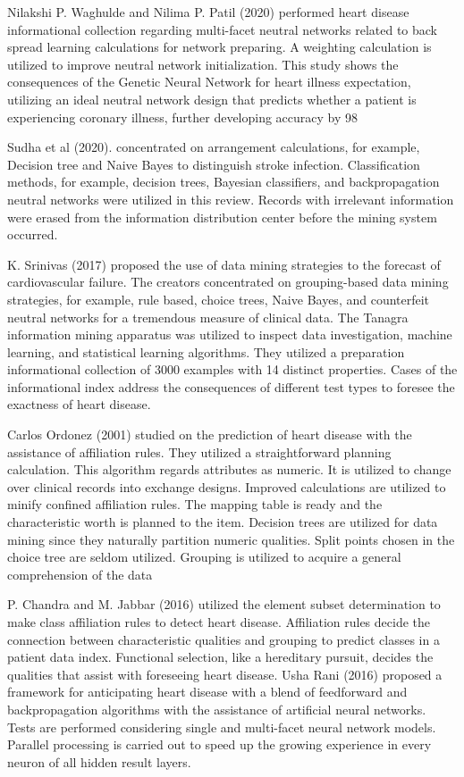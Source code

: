 Nilakshi P. Waghulde and Nilima P. Patil (2020) performed heart disease informational collection regarding multi-facet neutral networks related to back spread learning calculations for network preparing. A weighting calculation is utilized to improve neutral network initialization. This study shows the consequences of the Genetic Neural Network for heart illness expectation, utilizing an ideal neutral network design that predicts whether a patient is experiencing coronary illness, further developing accuracy by 98%

Sudha et al (2020). concentrated on arrangement calculations, for example, Decision tree and Naive Bayes to distinguish stroke infection. Classification methods, for example, decision trees, Bayesian classifiers, and backpropagation neutral networks were utilized in this review. Records with irrelevant information were erased from the information distribution center before the mining system occurred.

K. Srinivas (2017) proposed the use of data mining strategies to the forecast of cardiovascular failure. The creators concentrated on grouping-based data mining strategies, for example, rule based, choice trees, Naive Bayes, and counterfeit neutral networks for a tremendous measure of clinical data. The Tanagra information mining apparatus was utilized to inspect data investigation, machine learning, and statistical learning algorithms. They utilized a preparation informational collection of 3000 examples with 14 distinct properties. Cases of the informational index address the consequences of different test types to foresee the exactness of heart disease.

Carlos Ordonez (2001) studied on the prediction of heart disease with the assistance of affiliation rules. They utilized a straightforward planning calculation. This algorithm regards attributes as numeric. It is utilized to change over clinical records into exchange designs. Improved calculations are utilized to minify confined affiliation rules. The mapping table is ready and the characteristic worth is planned to the item. Decision trees are utilized for data mining since they naturally partition numeric qualities. Split points chosen in the choice tree are seldom utilized. Grouping is utilized to acquire a general comprehension of the data

P. Chandra and M. Jabbar (2016) utilized the element subset determination to make class affiliation rules to detect heart disease. Affiliation rules decide the connection between characteristic qualities and grouping to predict classes in a patient data index. Functional selection, like a hereditary pursuit, decides the qualities that assist with foreseeing heart disease. Usha Rani (2016) proposed a framework for anticipating heart disease with a blend of feedforward and backpropagation algorithms with the assistance of artificial neural networks. Tests are performed considering single and multi-facet neural network models. Parallel processing is carried out to speed up the growing experience in every neuron of all hidden result layers.


